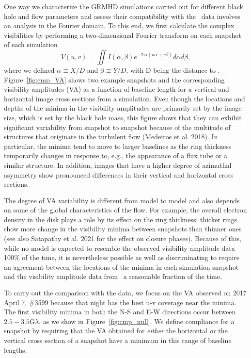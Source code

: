 One way we characterize the GRMHD simulations carried out for
different black hole and flow parameters and assess their
compatibility with the \sgra\ data involves an analysis in the Fourier
domain.
To this end, we first calculate the complex visibilities by performing
a two-dimensional Fourier transform on each snapshot of each
simulation
\begin{equation}
  V(u,v) = \iint I(\alpha,\beta) e^{-2\pi i(u\alpha+v\beta)}d\alpha d\beta,
\end{equation}
where we defined $\alpha \equiv X/D$ and $\beta \equiv Y/D$, with D
being the distance to \sgra.
Figure~\ref{fig:cmp_VA} shows two example snapshots and the
corresponding visibility amplitudes (VA) as a function of baseline
length for a vertical and horizontal image cross sections from a
simulation.
Even though the locations and depths of the minima in the visibility
amplitudes are primarily set by the image size, which is set by the
black hole mass, this figure shows that they can exhibit significant
variability from snapshot to snapshot because of the multitude of
structures that originate in the turbulent flow (Medeiros et
al. 2018).
In particular, the minima tend to move to larger baselines as the ring
thickness temporarily changes in response to, e.g., the appearance of
a flux tube or a similar structure.
In addition, images that have a higher degree of azimuthal asymmetry
show pronounced differences in their vertical and horizontal cross
sections.

The degree of VA variability is different from model to model and also
depends on some of the global characteristics of the flow.
For example, the overall electron density in the disk plays a role by
its effect on the ring thickness: thicker rings show more change in
the visibility minima between snapshots than thinner ones (see also
Satapathy et al. 2021 for the effect on closure phases).
Because of this, while no model is expected to resemble the observed
visibility amplitude data 100\% of the time, it is nevertheless
possible as well as discriminating to require an agreement between the
locations of the minima in each simulation snapshot and the visibility
amplitude data from \sgra\ a reasonable fraction of the time.

To carry out the comparison with the data, we focus on the VA observed
on 2017 April 7, \#3599 because that night has the best u-v coverage
near the minima.
The first visibility minima in both the N-S and E-W directions occur
between $2.5-3.5$\;G$\lambda$, as we show in
Figure~\ref{fig:cmp_null}.
We define compliance for a snapshot by requiring that the VA obtained
for {\it either} the horizontal {\it or} the vertical cross section of
a snapshot have a minimum in this range of baseline lengths.

